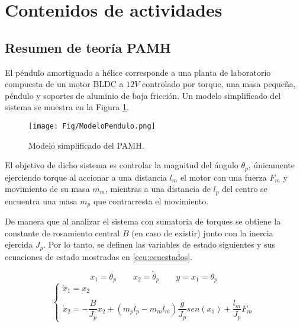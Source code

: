 \documentclass[12pt]{article}
\begin{document}

\section*{Contenidos de actividades}

\subsection*{Resumen de teoría PAMH}

El péndulo amortiguado a hélice corresponde a una planta de laboratorio compuesta de un motor BLDC a $12 V$ controlado por torque, una masa pequeña, péndulo y soportes de aluminio de baja fricción. Un modelo simplificado del sistema se muestra en la Figura \ref{fig:modpen}.

\begin{figure}[h]
	\centering
	\texttt{[image: Fig/ModeloPendulo.png]}
	\caption{Modelo simplificado del PAMH.}
	\label{fig:modpen}
\end{figure}

El objetivo de dicho sistema es controlar la magnitud del ángulo $\theta_p$, únicamente ejerciendo torque al accionar a una distancia $l_m$ el motor con una fuerza $F_m$ y movimiento de su masa $m_m$, mientras a una distancia de $l_p$ del centro se encuentra una masa $m_p$ que contrarresta el movimiento.

De manera que al analizar el sistema con sumatoria de torques se obtiene la constante de rosamiento central $B$ (en caso de existir) junto con la inercia ejercida $J_p$. Por lo tanto, se definen las variables de estado siguientes y sus ecuaciones de estado mostradas en \ref{ecu:ecuestados}.

\[x_1 = \theta_p \qquad x_2 = \dot{\theta}_p \qquad y = x_1 = \theta_p\]
\begin{equation}
	\left \{ \begin{array}{lcc} \dot{x}_1 = x_2 \\ \\ \dot{x}_2 = -\dfrac{B}{J_p} x_2 + (m_p l_p -m_m l_m)\dfrac{g}{J_p}sen(x_1) +\dfrac{l_m}{J_p}F_m \end{array} \right.
	\label{ecu:ecuestados}
\end{equation}
\end{document}
